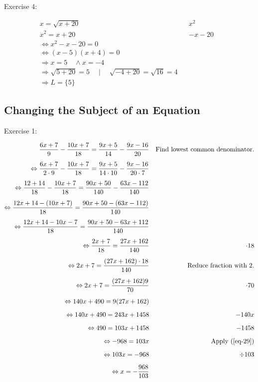 
Exercise 4:

\begin{align*}
    x = \sqrt{x+20} &&\text{$x^2$}&\\[1.25ex]
    x^2 = x+20 &&\text{$-x-20$}&\\[1.25ex]
    \Leftrightarrow x^2-x-20 = 0&\\[1.25ex]
    \Leftrightarrow (x-5)(x+4) = 0&\\[1.25ex]
    \Rightarrow x = 5 \quad \land x = -4&\\[1.25ex]
    \Rightarrow \sqrt{5+20} = 5 \quad \mid \quad \sqrt{-4+20} = \sqrt{16} = 4&\\[1.25ex]
    \Rightarrow L = \{5\} &
\end{align*}


\newpage 

\vspace{0.5cm}\subsection{Changing the Subject of an Equation }


\vspace{0.5cm} Exercise 1: 

\begin{align*}
    \frac{6x+7}{9} - \frac{10x+7}{18} = \frac{9x+5}{14} - \frac{9x-16}{20} &&\text{Find lowest common denominator.}&\\[1.25ex]
    \Leftrightarrow \frac{6x+7}{2 \cdot 9} - \frac{10x+7}{18} =\frac{9x+5}{14 \cdot 10} - \frac{9x-16}{20 \cdot 7} &\\[1.25ex]
    \Leftrightarrow  \frac{12+14}{18} - \frac{10x+7}{18} = \frac{90x+50}{140} - \frac{63x-112}{140} &\\[1.25ex]
    \Leftrightarrow  \frac{12x+14-(10x+7)}{18} = \frac{90x+50-(63x-112)}{140} &\\[1.25ex]
    \Leftrightarrow  \frac{12x+14-10x-7}{18} = \frac{90x+50-63x+112}{140} &\\[1.25ex]
    \Leftrightarrow \frac{2x+7}{18} = \frac{27x+162}{140} &&\text{$\cdot 18$}&\\[1.25ex]
    \Leftrightarrow  2x+7 = \frac{(27x+162)\cdot18}{140} &&\text{Reduce fraction with $2$.}&\\[1.25ex]
    \Leftrightarrow 2x+7 = \frac{(27x+162)9}{70} &&\text{$\cdot 70$}&\\[1.25ex]
    \Leftrightarrow 140x+490 = 9(27x+162)&\\[1.25ex]
    \Leftrightarrow 140x+490 = 243x+1458 &&\text{$-140x$}&\\[1.25ex]
    \Leftrightarrow 490 = 103x + 1458 &&\text{$-1458$}&\\[1.25ex]   
    \Leftrightarrow -968 = 103x &&\text{Apply \bref{eq-29}}&\\[1.25ex]
    \Leftrightarrow 103x = -968 &&\text{$\div 103$}&\\[1.25ex]
    \Leftrightarrow x = -\frac{968}{103}&
\end{align*}

